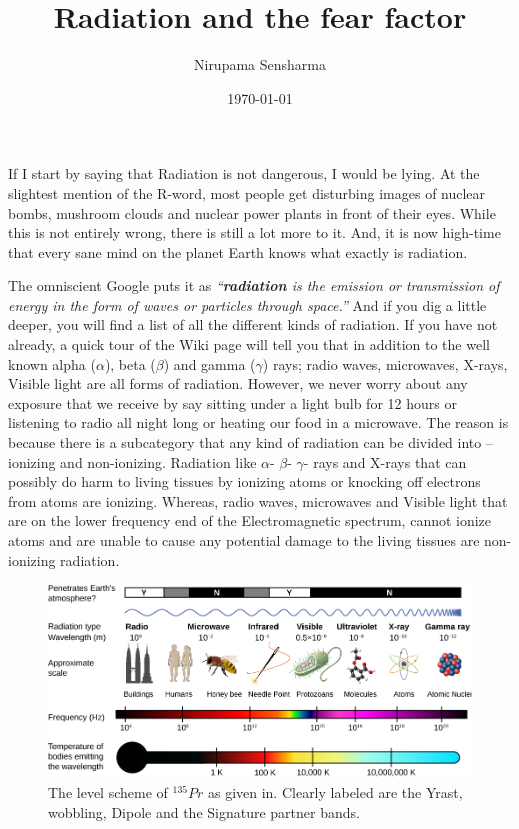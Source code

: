 \documentclass[%
 amsmath,amssymb,
]{article}
\begin{document}
\title{Radiation and the fear factor}


\author{Nirupama Sensharma}

\date{\today}
%
\maketitle
%
%
%

If I start by saying that Radiation is not dangerous, I would be lying. At the slightest mention of the R-word, most people get disturbing images of nuclear bombs, mushroom clouds and nuclear power plants in front of their eyes. While this is not entirely wrong, there is still a lot more to it. And, it is now high-time that every sane mind on the planet Earth knows what exactly is radiation.

The omniscient Google puts it as \textit{“\textbf{radiation} is the emission or transmission of energy in the form of  waves or particles through space.”} And if you dig a little deeper, you will find a list of all the different kinds of radiation. If you have not already, a quick tour of the Wiki page will tell you that in addition to the well known alpha ($\alpha$), beta ($\beta$) and gamma ($\gamma$) rays; radio waves, microwaves, X-rays, Visible light are all forms of radiation. However, we never worry about any exposure that we receive by say sitting under a light bulb for 12 hours or listening to radio all night long or heating our food in a microwave. The reason is because there is a subcategory that any kind of radiation can be divided into – ionizing and non-ionizing. Radiation like $\alpha$- $\beta$- $\gamma$- rays and X-rays that can possibly do harm to living tissues by ionizing atoms or knocking off electrons from atoms are ionizing. Whereas, radio waves, microwaves and Visible light that are on the lower frequency end of the Electromagnetic spectrum, cannot ionize atoms and are unable to cause any potential damage to the living tissues are non-ionizing radiation.

\begin{figure}
\begin{center}
\includegraphics[width = \textwidth]{EM_spectrum}
\caption{The level scheme of $^{135}Pr$ as given in. Clearly labeled are the Yrast, wobbling, Dipole and the Signature partner bands.}
\end{center}
\end{figure}
\end{document}
